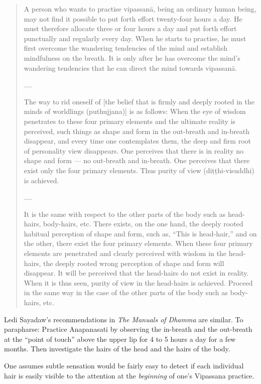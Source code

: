 \documentclass[a4paper, amsfonts, amssymb, amsmath, reprint, showkeys, nofootinbib, twoside]{revtex4-1}
\begin{document}
\begin{quote}
  A person who wants to practise vipassanā, being an ordinary human being,
    may not find it possible to put forth effort twenty-four hours a day. He must
    therefore allocate three or four hours a day and put
    forth effort punctually and regularly every day. When he starts to practise, he must
    first overcome the wandering tendencies of the mind and establish mindfulness on the
    breath. It is only after he has overcome the mind’s wandering tendencies that he can
    direct the mind towards vipassanā.

    ....

    The way to rid oneself of [the belief that is firmly and deeply rooted in the minds
      of worldlings (puthujjana)] is as follows: When the eye of wisdom penetrates to
    these four primary elements and the ultimate reality is perceived, such things as
    shape and form in the out-breath and in-breath disappear, and every time one
    contemplates them, the deep and firm root of personality view disappears. One
    perceives that there is in reality no shape and form --- no out-breath and
    in-breath. One perceives that there exist only the four primary elements. Thus
    purity of view (diṭṭhi-visuddhi) is achieved.

    ....

    It is the same with respect to the other parts of the body such as head-hairs,
    body-hairs, etc. There exists, on the one hand, the deeply rooted habitual
    perception of shape and form, such as, ``This is head-hair,'' and on the other, there
    exist the four primary elements. When these four primary elements are penetrated
    and clearly perceived with wisdom in the head-hairs, the deeply rooted wrong
    perception of shape and form will disappear. It will be perceived that the
    head-hairs do not exist in reality. When it is thus seen, purity of view in the
    head-hairs is achieved. Proceed in the same way in the case of the other parts of
    the body such as body-hairs, etc.
\end{quote}

Ledi Sayadaw's recommendations in \textit{The Manuals of Dhamma} are similar. To
parapharse: Practice Anapanasati by observing the in-breath and the out-breath at the
``point of touch'' above the upper lip for 4 to 5 hours a day for a few months. Then
investigate the hairs of the head and the hairs of the body.

One assumes subtle sensation would be fairly easy to detect if each individual hair
is easily visible to the attention at the \textit{beginning} of one's Vipassana
practice.
\end{document}

